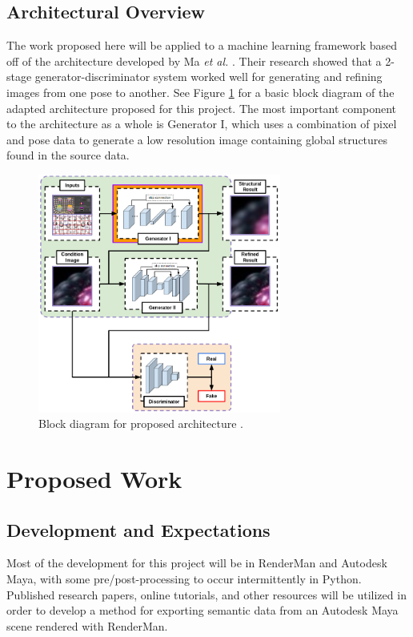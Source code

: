 \documentclass[conference]{IEEEtran}
\begin{document}
\subsection{Architectural Overview}
\label{subsec:architecture}
The work proposed here will be applied to a machine learning framework
based off of the architecture
developed by Ma \textit{et al.} \cite{pose_guided_image_generation}.
Their research showed that a 2-stage generator-discriminator system worked well for generating
and refining images from one pose to another.
See Figure \ref{fig:block_diagram} for a basic block diagram of the adapted architecture
proposed for this project.
The most important component to the architecture as a whole
is Generator I, which uses a combination of pixel and pose data to generate a
low resolution image containing global structures found in the
source data.

\begin{figure}[htbp]
\centerline{\includegraphics[width=8cm]{block_diagram.png}}
\caption{Block diagram for proposed architecture \cite{thesis_harris}.}
\label{fig:block_diagram}
\end{figure}

\section{Proposed Work}
\label{sec:proposed_work}
\subsection{Development and Expectations}
Most of the development for this project will be in RenderMan and Autodesk Maya,
with some pre/post-processing to occur intermittently in Python.
Published research papers, online tutorials, and other resources will be
utilized in order to develop a method for exporting semantic data from an Autodesk Maya scene
rendered with RenderMan.
\end{document}
